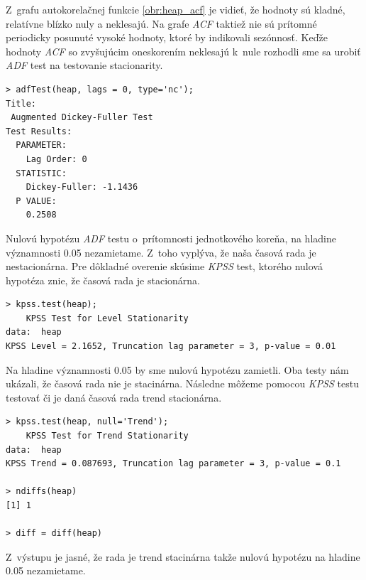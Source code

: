 \documentclass[12pt,a4paper,oneside,final]{article}
\theoremstyle{definition}
\theoremstyle{remark}
\numberwithin{equation}{section}
\begin{document}
Z~grafu autokorelačnej funkcie \ref{obr:heap_acf} je vidieť, že hodnoty sú kladné,
relatívne blízko nuly a neklesajú. 
Na grafe \emph{ACF} taktiež nie sú prítomné periodicky posunuté vysoké hodnoty, 
ktoré by indikovali sezónnosť.
Keďže hodnoty \emph{ACF} so zvyšujúcim oneskorením neklesajú k~nule rozhodli sme sa urobiť
\emph{ADF} test na testovanie stacionarity.

\begin{minipage}{\linewidth}
\begingroup
\fontsize{9pt}{7pt}\selectfont  %
\begin{verbatim}
> adfTest(heap, lags = 0, type='nc');
Title:
 Augmented Dickey-Fuller Test
Test Results:
  PARAMETER:
    Lag Order: 0
  STATISTIC:
    Dickey-Fuller: -1.1436
  P VALUE:
    0.2508 
\end{verbatim}
\endgroup
\end{minipage}

Nulovú hypotézu \emph{ADF} testu o~prítomnosti jednotkového koreňa, na hladine významnosti 0.05
nezamietame. Z~toho vyplýva, že naša časová rada je nestacionárna. Pre dôkladné 
overenie skúsime \emph{KPSS} test, ktorého nulová hypotéza znie, že časová rada je stacionárna.

\begin{minipage}{\linewidth}
\begingroup
\fontsize{9pt}{7pt}\selectfont %
\begin{verbatim}
> kpss.test(heap);
	KPSS Test for Level Stationarity
data:  heap
KPSS Level = 2.1652, Truncation lag parameter = 3, p-value = 0.01
\end{verbatim}
\endgroup
\end{minipage}

Na hladine významnosti 0.05 by sme nulovú hypotézu zamietli. Oba testy nám ukázali, že časová
rada nie je stacinárna. 
Následne môžeme pomocou \emph{KPSS} testu testovať či je daná časová rada trend stacionárna.

\begin{minipage}{\linewidth}
\begingroup
\fontsize{9pt}{7pt}\selectfont %
\begin{verbatim}
> kpss.test(heap, null='Trend');
	KPSS Test for Trend Stationarity
data:  heap
KPSS Trend = 0.087693, Truncation lag parameter = 3, p-value = 0.1

> ndiffs(heap)
[1] 1

> diff = diff(heap)
\end{verbatim}
\endgroup
\end{minipage}

Z~výstupu je jasné, že rada je trend stacinárna takže nulovú hypotézu na hladine 0.05
nezamietame.
\end{document}
